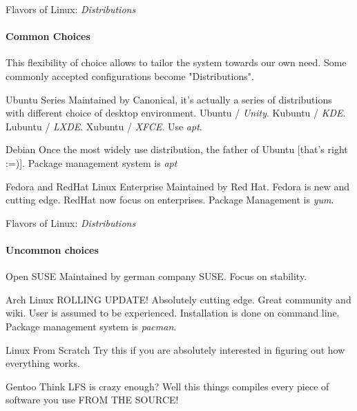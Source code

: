 \begin{frame}{Flavors of Linux: \textit{Distributions}}
\framesubtitle{Common Choices}
\begin{small}
	This flexibility of choice allows to tailor the system towards our own need. Some commonly accepted configurations become "Distributions".
\end{small} 
\begin{block}{Ubuntu Series}
	Maintained by Canonical, it's actually a series of distributions with different choice of desktop environment. Ubuntu / \textit{Unity}. Kubuntu / \textit{KDE}. Lubuntu / \textit{LXDE}. Xubuntu / \textit{XFCE}. Use \textit{apt}.
\end{block}
\begin{block}{Debian}
	Once the most widely use distribution, the father of Ubuntu [that's right :=)]. Package management system is \textit{apt}
\end{block}
\begin{block}{Fedora and RedHat Linux Enterprise}
	Maintained by Red Hat. Fedora is new and cutting edge. RedHat now focus on enterprises. Package Management is \textit{yum}.
\end{block}
\end{frame}

\begin{frame}{Flavors of Linux: \textit{Distributions}}
\framesubtitle{Uncommon choices}
\begin{block}{Open SUSE}
	Maintained by german company SUSE. Focus on stability. 
\end{block}
\begin{block}{Arch Linux}
	ROLLING UPDATE! Absolutely cutting edge. Great community and wiki. User is assumed to be experienced. Installation is done on command line. Package management system is \textit{pacman}.
\end{block}
\begin{block}{Linux From Scratch}
	Try this if you are absolutely interested in figuring out how everything works.
\end{block}
\begin{block}{Gentoo}
	Think LFS is crazy enough? Well this things compiles every piece of software you use FROM THE SOURCE! 
\end{block}
\end{frame}

